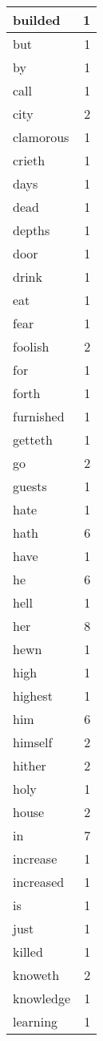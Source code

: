 \begin{center}
\begin{longtable}{l|r}
builded & 1\\ \hline 
but & 1\\ \hline 
by & 1\\ \hline 
call & 1\\ \hline 
city & 2\\ \hline 
clamorous & 1\\ \hline 
crieth & 1\\ \hline 
days & 1\\ \hline 
dead & 1\\ \hline 
depths & 1\\ \hline 
door & 1\\ \hline 
drink & 1\\ \hline 
eat & 1\\ \hline 
fear & 1\\ \hline 
foolish & 2\\ \hline 
for & 1\\ \hline 
forth & 1\\ \hline 
furnished & 1\\ \hline 
getteth & 1\\ \hline 
go & 2\\ \hline 
guests & 1\\ \hline 
hate & 1\\ \hline 
hath & 6\\ \hline 
have & 1\\ \hline 
he & 6\\ \hline 
hell & 1\\ \hline 
her & 8\\ \hline 
hewn & 1\\ \hline 
high & 1\\ \hline 
highest & 1\\ \hline 
him & 6\\ \hline 
himself & 2\\ \hline 
hither & 2\\ \hline 
holy & 1\\ \hline 
house & 2\\ \hline 
in & 7\\ \hline 
increase & 1\\ \hline 
increased & 1\\ \hline 
is & 1\\ \hline 
just & 1\\ \hline 
killed & 1\\ \hline 
knoweth & 2\\ \hline 
knowledge & 1\\ \hline 
learning & 1\\ \hline 

\end{longtable}
\end{center}
